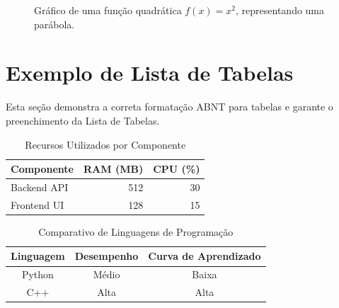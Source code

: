 \documentclass[
	12pt,				%
    oneside,            %
	a4paper,			%
	english,			%
	brazilian,		    %
	]{AcademicoUFT}
\begin{document}
\begin{figure}[H]
    \centering
    \caption{Gráfico de uma função quadrática $f(x)=x^2$, representando uma parábola.}
    \label{fig:funcao_quadratica}
\end{figure}





\newpage %
\section{Exemplo de Lista de Tabelas}

\noindent Esta seção demonstra a correta formatação ABNT para tabelas e garante o preenchimento da Lista de Tabelas.

\begin{table}[H]
    \centering
    \caption{Recursos Utilizados por Componente}
    \label{tab:recursos_comp}
    \begin{tabular}{lrr}
        \toprule
        Componente & RAM (MB) & CPU (\%) \\
        \midrule
        Backend API & 512 & 30 \\
        Frontend UI & 128 & 15 \\
        \bottomrule
    \end{tabular}
\end{table}

\begin{table}[H]
    \centering
    \caption{Comparativo de Linguagens de Programação}
    \label{tab:linguagens_comp}
    \begin{tabular}{ccc}
        \toprule
        Linguagem & Desempenho & Curva de Aprendizado \\
        \midrule
        Python & Médio & Baixa \\
        C++ & Alta & Alta \\
        \bottomrule
    \end{tabular}
\end{table}
\end{document}
